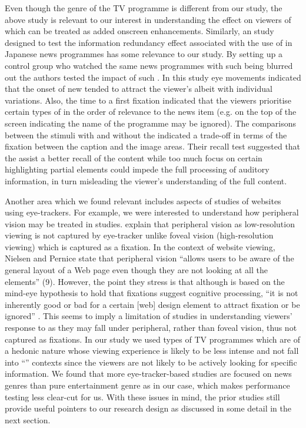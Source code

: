 \documentclass[output=paper]{langsci/langscibook}
\begin{document}
Even though the genre of the TV programme is different from our study, the above study is relevant to our interest in understanding the effect on viewers of  which can be treated as added onscreen enhancements. Similarly, an  study \citep{Matsukawa2009} designed to test the information redundancy effect associated with the use of  in Japanese news programmes has some relevance to our study.  By setting up a control group who watched the same news programmes with such  being blurred out the authors tested the impact of such .  In this study eye movements indicated that the onset of new  tended to attract the viewer's  albeit with individual variations. Also, the time to a first fixation indicated that the viewers prioritise certain types of  in the order of relevance to the news item (e.g.  on the top of the screen indicating the name of the programme may be ignored). The comparisons between the stimuli with and without the  indicated a trade-off in terms of the fixation between the caption and the image areas. Their recall test suggested that the  assist a better recall of the content while too much focus on certain  highlighting partial elements could impede the full processing of auditory information, in turn misleading the viewer's understanding of the full content.       


\largerpage
Another area which we found relevant includes aspects of  studies of websites using eye-trackers. For example, we were interested to understand how peripheral vision may be treated in  studies.  \citet[6--7]{Nielsen2010} explain that peripheral vision as low-resolution viewing is not captured by eye-tracker unlike foveal vision (high-resolution viewing) which is captured as a fixation.  In the context of website viewing, Nielsen and Pernice state that peripheral vision ``allows users to be aware of the general layout of a Web page even though they are not looking at all the elements'' (9). However, the point they stress is that although  is based on the mind-eye hypothesis to hold that fixations suggest cognitive processing, ``it is not inherently good or bad for a certain [web] design element to attract fixation or be ignored'' \citep[10]{Nielsen2010}.  This seems to imply a limitation of  studies in understanding viewers' response to  as they may fall under peripheral, rather than foveal vision, thus not captured as fixations. In our study we used types of TV programmes which are of a hedonic nature whose viewing experience is likely to be less intense and not fall into ``'' contexts since the viewers are not likely to be actively looking for specific information.  We found that more eye-tracker-based studies are focused on news genres than pure entertainment genre as in our case, which makes performance testing less clear-cut for us.  With these issues in mind, the prior studies still provide useful pointers to our research design as discussed in some detail in the next section. 
\end{document}
